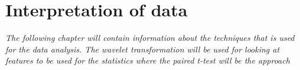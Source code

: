 \chapter{Interpretation of data}
\textit{The following chapter will contain information about the techniques that is used for the data analysis. The wavelet transformation will be used for looking at features to be used for the statistics where the paired t-test will be the approach}